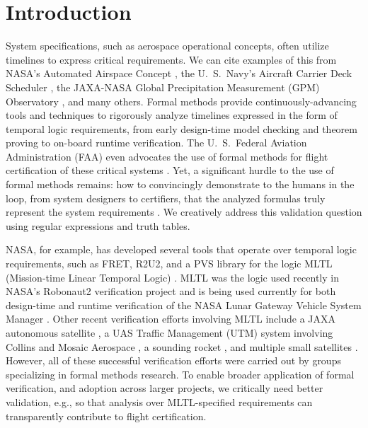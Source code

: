 \documentclass[runningheads]{llncs}
\begin{document}
\vspace{-0.1in}
\section{Introduction}
\vspace{-0.1in}
System specifications, such as aerospace operational concepts, often utilize timelines to express critical requirements. We can cite examples of this from NASA's Automated Airspace Concept \cite{EH10}, the U.~S.~Navy's Aircraft Carrier Deck Scheduler \cite{RCRBS11}, the JAXA-NASA Global Precipitation Measurement (GPM) Observatory \cite{GPM}, and many others. Formal methods provide continuously-advancing tools and techniques to rigorously analyze timelines expressed in the form of temporal logic requirements, from early design-time model checking and theorem proving to on-board runtime verification. The U.~S.~Federal Aviation Administration (FAA) even advocates the use of formal methods for flight certification of these critical systems \cite{DO-178C,DO-254,DO-333}. Yet, a significant hurdle to the use of formal methods remains: how to convincingly demonstrate to the humans in the loop, from system designers to certifiers, that the analyzed formulas truly represent the system requirements \cite{Roz16}. We creatively address this validation question using regular expressions and truth tables.

NASA, for example, has developed several tools that operate over temporal logic requirements, such as FRET\cite{GMRPSS20}, R2U2\cite{RS17}, and a PVS library \cite{CTGPD22} for the logic MLTL (Mission-time Linear Temporal Logic) \cite{RRS14,LVR22}. MLTL was the logic used recently in NASA's Robonaut2 verification project \cite{KZJZR20} and is being used currently for both design-time and runtime verification of the NASA Lunar Gateway Vehicle System Manager \cite{DBR21}. Other recent verification %
efforts involving MLTL include a JAXA autonomous satellite \cite{JAXA}, a UAS Traffic Management (UTM) system involving Collins and Mosaic Aerospace \cite{HCHJR21}, a sounding rocket \cite{HLR21}, and multiple small satellites \cite{LLR21,LJBHCLR22,AJR22}. However, all of these successful verification efforts were carried out by groups specializing in formal methods research. To enable broader application of formal verification, and adoption across larger projects, we critically need better validation, e.g., so that analysis over MLTL-specified requirements can transparently contribute to flight certification. 
\end{document}
